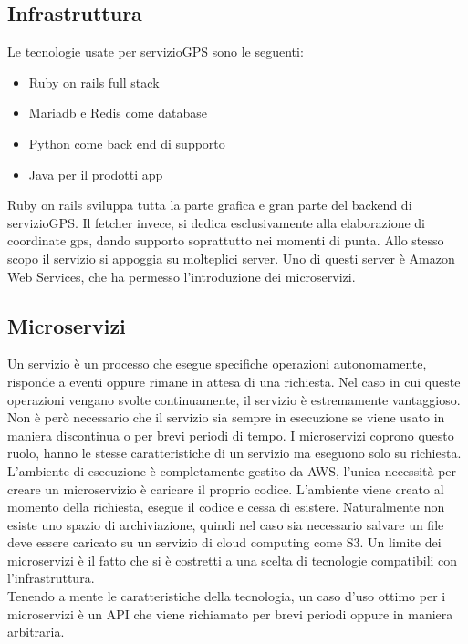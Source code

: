 \documentclass[12pt]{article}
\begin{document}
\subsection{Infrastruttura}
Le tecnologie usate per servizioGPS sono le seguenti:
\begin{itemize}
  \item Ruby on rails full stack
  \item Mariadb e Redis come database
  \item Python come back end di supporto
  \item Java per il prodotti app
\end{itemize}
Ruby on rails sviluppa tutta la parte grafica e gran parte del backend di servizioGPS. 
Il fetcher invece, si dedica esclusivamente alla elaborazione di coordinate gps, 
dando supporto soprattutto nei momenti di punta. Allo stesso scopo il servizio 
si appoggia su molteplici server.
Uno di questi server è Amazon Web Services, che ha permesso l'introduzione dei 
microservizi. 

\subsection{Microservizi}
Un servizio è un processo che esegue specifiche operazioni autonomamente, 
risponde a eventi oppure rimane in attesa di una richiesta. 
Nel caso in cui queste operazioni vengano svolte continuamente, il servizio è 
estremamente vantaggioso. Non è però necessario che il servizio sia sempre in 
esecuzione se viene usato in maniera discontinua o per brevi periodi di tempo. 
I microservizi coprono questo ruolo, hanno le stesse caratteristiche di un servizio
ma eseguono solo su richiesta. 
\\ L'ambiente di esecuzione è completamente gestito da AWS, l'unica necessità per 
creare un microservizio è caricare il proprio codice. 
L'ambiente viene creato al momento della richiesta, esegue il codice e cessa di 
esistere. Naturalmente non esiste uno spazio di archiviazione, quindi nel caso sia
necessario salvare un file deve essere caricato su un servizio di cloud computing 
come S3. Un limite dei microservizi è il fatto che si è costretti a una scelta di 
tecnologie compatibili con l'infrastruttura.
\\ Tenendo a mente le caratteristiche della tecnologia, un caso d'uso ottimo per i microservizi è 
un API che viene richiamato per brevi periodi oppure in maniera arbitraria.
\end{document}
